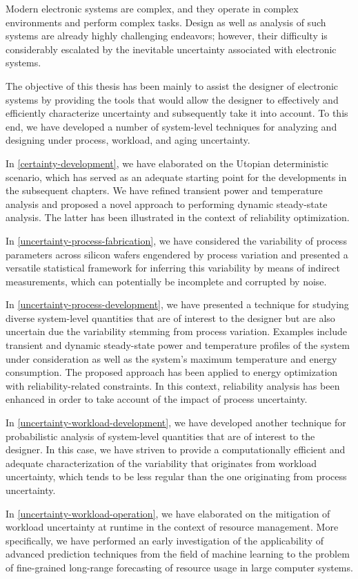 Modern electronic systems are complex, and they operate in complex environments
and perform complex tasks. Design as well as analysis of such systems are
already highly challenging endeavors; however, their difficulty is considerably
escalated by the inevitable uncertainty associated with electronic systems.

The objective of this thesis has been mainly to assist the designer of
electronic systems by providing the tools that would allow the designer to
effectively and efficiently characterize uncertainty and subsequently take it
into account. To this end, we have developed a number of system-level techniques
for analyzing and designing under process, workload, and aging uncertainty.

In \cref{certainty-development}, we have elaborated on the Utopian deterministic
scenario, which has served as an adequate starting point for the developments in
the subsequent chapters. We have refined transient power and temperature
analysis and proposed a novel approach to performing dynamic steady-state
analysis. The latter has been illustrated in the context of reliability
optimization.

In \cref{uncertainty-process-fabrication}, we have considered the variability of
process parameters across silicon wafers engendered by process variation and
presented a versatile statistical framework for inferring this variability by
means of indirect measurements, which can potentially be incomplete and
corrupted by noise.

In \cref{uncertainty-process-development}, we have presented a technique for
studying diverse system-level quantities that are of interest to the designer
but are also uncertain due the variability stemming from process variation.
Examples include transient and dynamic steady-state power and temperature
profiles of the system under consideration as well as the system's maximum
temperature and energy consumption. The proposed approach has been applied to
energy optimization with reliability-related constraints. In this context,
reliability analysis has been enhanced in order to take account of the impact of
process uncertainty.

In \cref{uncertainty-workload-development}, we have developed another technique
for probabilistic analysis of system-level quantities that are of interest to
the designer. In this case, we have striven to provide a computationally
efficient and adequate characterization of the variability that originates from
workload uncertainty, which tends to be less regular than the one originating
from process uncertainty.

In \cref{uncertainty-workload-operation}, we have elaborated on the mitigation
of workload uncertainty at runtime in the context of resource management. More
specifically, we have performed an early investigation of the applicability of
advanced prediction techniques from the field of machine learning to the problem
of fine-grained long-range forecasting of resource usage in large computer
systems.
